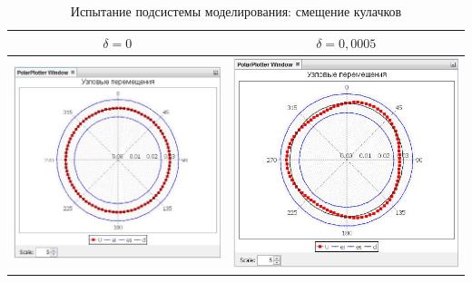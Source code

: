 \documentclass[14pt,oneside,final]{extreport}
\begin{document}
\begin{appendices}
	\begin{table}[h!]
		\centering
		\caption{Испытание подсистемы моделирования: смещение кулачков}
		\label{tab:displ-tests}{
			{\tabulinesep=1.2mm
				\begin{tabu}[]{|c|c|}
					\hline
					$ \delta = 0 $ & 	$ \delta = 0,0005 $ \\ \hline
					\includegraphics[scale=0.55]{img/simulation-displ-test-graph0} & \includegraphics[scale=0.55]{img/simulation-displ-test-graph3}  \\ 

\end{tabu}}}
\end{table}
\end{appendices}
\end{document}
